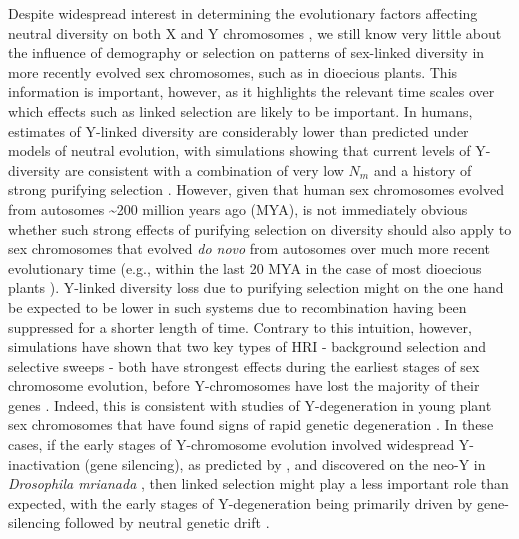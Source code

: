 \documentclass[9pt,twocolumn,twoside]{gsajnl}
\begin{document}
Despite widespread interest in determining the evolutionary factors affecting neutral diversity on both X and Y chromosomes \citep{ellegren2011,bachtrog2013NRG}, we still know very little about the influence of demography or selection on patterns of sex-linked diversity in more recently evolved sex chromosomes, such as in dioecious plants. This information is important, however, as it highlights the relevant time scales over which effects such as linked selection are likely to be important. In humans, estimates of Y-linked diversity are considerably lower than predicted under models of neutral evolution, with simulations showing that current levels of Y-diversity are consistent with a combination of very low $N_{m}$ and a history of strong purifying selection \citep{Wilsonsayres2014}. However, given that human sex chromosomes evolved from autosomes \textasciitilde 200 million years ago (MYA), is not immediately obvious whether such strong effects of purifying selection on diversity should also apply to sex chromosomes that evolved \textit{do novo} from autosomes over much more recent evolutionary time (e.g., within the last 20 MYA in the case of most dioecious plants \citep{charlesworth2015plant}). Y-linked diversity loss due to purifying selection might on the one hand be expected to be lower in such systems due to recombination having been suppressed for a shorter length of time. Contrary to this intuition, however, simulations have shown that two key types of HRI - background selection and selective sweeps - both have strongest effects during the earliest stages of sex chromosome evolution, before Y-chromosomes have lost the majority of their genes \citep{bachtrog2008temporal}. Indeed, this is consistent with studies of Y-degeneration in young plant sex chromosomes that have found signs of rapid genetic degeneration \citep{hough2014,papadopulos2015,charlesworth2016plant}. In these cases, if the early stages of Y-chromosome evolution involved widespread Y-inactivation (gene silencing), as predicted by \citep{orr1998adaptive}, and discovered on the neo-Y in \textit{Drosophila mrianada} \citep{zhou2012chromosome}, then linked selection might play a less important role than expected, with the early stages of Y-degeneration being primarily driven by gene-silencing followed by neutral genetic drift \citep{bachtrog2013NRG}.

\end{document}

